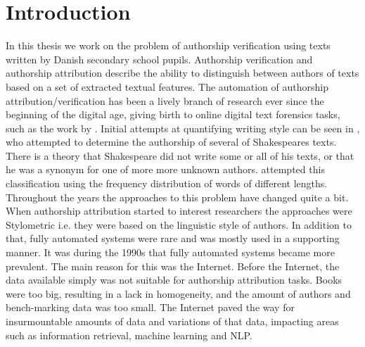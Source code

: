 %

\section{Introduction} \label{sec:introduction}


In this thesis we work on the problem of authorship verification using texts
written by Danish secondary school pupils. Authorship verification and
authorship attribution describe the ability to distinguish between authors of
texts based on a set of extracted textual features. The automation of authorship
attribution/verification has been a lively branch of research ever since the
beginning of the digital age, giving birth to online digital text forensics
tasks, such as the work by \citet{pan:2015}. Initial attempts at quantifying
writing style can be seen in \citet{Mendenhall237}, who attempted to determine
the authorship of several of Shakespeares texts. There is a theory that
Shakespeare did not write some or all of his texts, or that he was a synonym
for one of more more unknown authors. \citet{Mendenhall237} attempted this
classification using the frequency distribution of words of different lengths.
Throughout the years the approaches to this problem have changed quite a bit.
When authorship attribution started to interest researchers the approaches were
Stylometric i.e. they were based on the linguistic style of authors. In addition
to that, fully automated systems were rare and was mostly used in a supporting
manner. It was during the 1990s that fully automated systems became more
prevalent. The main reason for this was the Internet. Before the Internet, the
data available simply was not suitable for authorship attribution tasks. Books
were too big, resulting in a lack in homogeneity, and the amount of authors and
bench-marking data was too small. The Internet paved the way for insurmountable
amounts of data and variations of that data, impacting areas such as information
retrieval, machine learning and \gls{NLP}.

